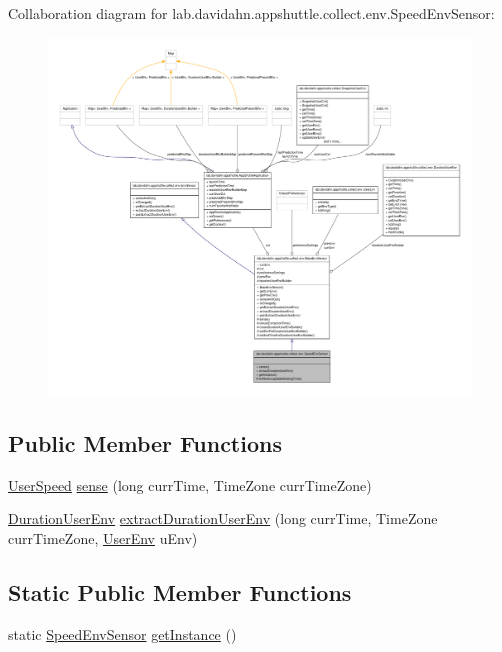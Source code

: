 \-Collaboration diagram for lab.\-davidahn.\-appshuttle.\-collect.\-env.\-Speed\-Env\-Sensor\-:
\nopagebreak
\begin{figure}[H]
\begin{center}
\leavevmode
\includegraphics[width=350pt]{classlab_1_1davidahn_1_1appshuttle_1_1collect_1_1env_1_1_speed_env_sensor__coll__graph}
\end{center}
\end{figure}
\subsection*{\-Public \-Member \-Functions}
\begin{DoxyCompactItemize}
\item 
\hyperlink{classlab_1_1davidahn_1_1appshuttle_1_1collect_1_1env_1_1_user_speed}{\-User\-Speed} \hyperlink{classlab_1_1davidahn_1_1appshuttle_1_1collect_1_1env_1_1_speed_env_sensor_a977654629824005ac4a745c700111354}{sense} (long curr\-Time, \-Time\-Zone curr\-Time\-Zone)
\item 
\hyperlink{classlab_1_1davidahn_1_1appshuttle_1_1collect_1_1env_1_1_duration_user_env}{\-Duration\-User\-Env} \hyperlink{classlab_1_1davidahn_1_1appshuttle_1_1collect_1_1env_1_1_speed_env_sensor_a4741b543901607a0f22e49fc64276c5f}{extract\-Duration\-User\-Env} (long curr\-Time, \-Time\-Zone curr\-Time\-Zone, \hyperlink{classlab_1_1davidahn_1_1appshuttle_1_1collect_1_1env_1_1_user_env}{\-User\-Env} u\-Env)
\end{DoxyCompactItemize}
\subsection*{\-Static \-Public \-Member \-Functions}
\begin{DoxyCompactItemize}
\item 
static \hyperlink{classlab_1_1davidahn_1_1appshuttle_1_1collect_1_1env_1_1_speed_env_sensor}{\-Speed\-Env\-Sensor} \hyperlink{classlab_1_1davidahn_1_1appshuttle_1_1collect_1_1env_1_1_speed_env_sensor_afa8567d9c1f62b9277e46f0a048b8d8d}{get\-Instance} ()
\end{DoxyCompactItemize}
